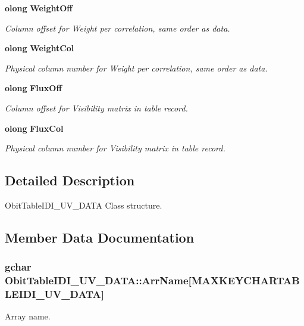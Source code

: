 \begin{CompactItemize}
{\bf olong} {\bf Weight\-Off}
\begin{CompactList}\small\item\em Column offset for Weight per correlation, same order as data. \item\end{CompactList}\item 
{\bf olong} {\bf Weight\-Col}
\begin{CompactList}\small\item\em Physical column number for Weight per correlation, same order as data. \item\end{CompactList}\item 
{\bf olong} {\bf Flux\-Off}
\begin{CompactList}\small\item\em Column offset for Visibility matrix in table record. \item\end{CompactList}\item 
{\bf olong} {\bf Flux\-Col}
\begin{CompactList}\small\item\em Physical column number for Visibility matrix in table record. \item\end{CompactList}\end{CompactItemize}


\subsection{Detailed Description}
Obit\-Table\-IDI\_\-UV\_\-DATA Class structure. 



\subsection{Member Data Documentation}
\subsubsection{\setlength{\rightskip}{0pt plus 5cm}gchar {\bf Obit\-Table\-IDI\_\-UV\_\-DATA::Arr\-Name}[MAXKEYCHARTABLEIDI\_\-UV\_\-DATA]}\label{structObitTableIDI__UV__DATA_o24}


Array name. 

